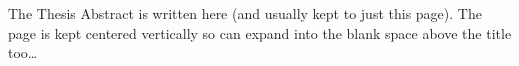 \documentclass[11pt, titlepage, a4paper, twoside, onecolumn, DIV=calc]{scrbook} %
\begin{document}
\clearpage
\setcounter{page}{1}





\frontmatter %
\thispagestyle{plain} 




The Thesis Abstract is written here (and usually kept to just this page). The page is kept centered vertically so can expand into the blank space above the title too\ldots

\clearpage %






\pagestyle{plain} %





%
%


\begin{multicols}{2}[\chapter*{\nomname}] 
 \printnomenclature[1.0 in]
\end{multicols} 







\clearpage
\end{document}
